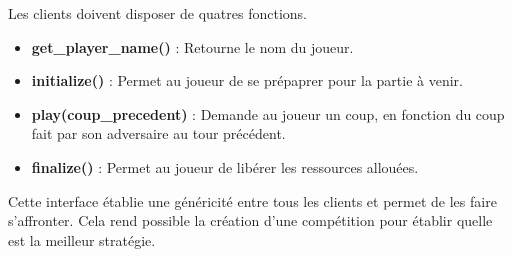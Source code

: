 Les clients doivent disposer de quatres fonctions.
\begin{itemize}
    \item \textbf{get\_player\_name()} : Retourne le nom du joueur.
    \item \textbf{initialize()} : Permet au joueur de se prépaprer pour la partie à venir.
    \item \textbf{play(coup\_precedent)} : Demande au joueur un coup, en fonction 
    du coup fait par son adversaire au tour précédent.
    \item \textbf{finalize()} : Permet au joueur de libérer les ressources allouées.
\end{itemize}

Cette interface établie une généricité entre tous les clients et permet de les faire s'affronter.
Cela rend possible la création d'une compétition pour établir quelle est 
la meilleur stratégie.